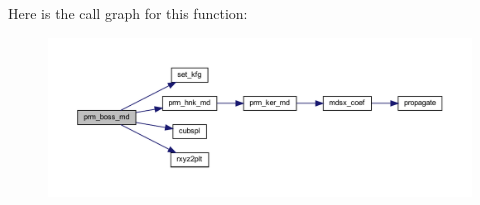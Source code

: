 Here is the call graph for this function\+:\nopagebreak
\begin{figure}[H]
\begin{center}
\leavevmode
\includegraphics[width=350pt]{Leroi__c_8f90_ac15aa4c46264754ea7abffbe2ea1926c_cgraph}
\end{center}
\end{figure}
\mbox{\label{Leroi__c_8f90_a8fe568053ec398fc50ab206827a43d81}} 
